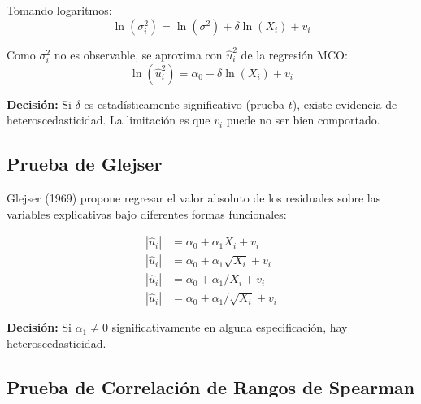 \documentclass[12pt,a4paper]{report}
\theoremstyle{definition}
\theoremstyle{remark}
\newcommand{\uhat}{\hat{u}}
\begin{document}
Tomando logaritmos:
\begin{equation}
  \ln(\sigma_i^2) = \ln(\sigma^2) + \delta \ln(X_i) + v_i
  \label{eq:park_log}
\end{equation}

Como $\sigma_i^2$ no es observable, se aproxima con $\uhat_i^2$ de la regresión MCO:
\begin{equation}
  \ln(\uhat_i^2) = \alpha_0 + \delta \ln(X_i) + v_i
  \label{eq:park_regresion}
\end{equation}

\textbf{Decisión:} Si $\delta$ es estadísticamente significativo (prueba $t$), existe evidencia de heteroscedasticidad. La limitación es que $v_i$ puede no ser bien comportado.

\subsection{Prueba de Glejser}

Glejser (1969) propone regresar el valor absoluto de los residuales sobre las variables explicativas bajo diferentes formas funcionales:

\begin{align}
  |\uhat_i| &= \alpha_0 + \alpha_1 X_i + v_i \label{eq:glejser1}\\
  |\uhat_i| &= \alpha_0 + \alpha_1 \sqrt{X_i} + v_i \label{eq:glejser2}\\
  |\uhat_i| &= \alpha_0 + \alpha_1 / X_i + v_i \label{eq:glejser3}\\
  |\uhat_i| &= \alpha_0 + \alpha_1 / \sqrt{X_i} + v_i \label{eq:glejser4}
\end{align}

\textbf{Decisión:} Si $\alpha_1 \neq 0$ significativamente en alguna especificación, hay heteroscedasticidad.

\subsection{Prueba de Correlación de Rangos de Spearman}
\end{document}
